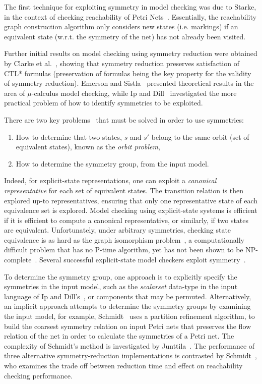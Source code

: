 The first technique for exploiting symmetry in model checking was due to
Starke, in the context of checking reachability of Petri
Nets~\cite{Starke1991}.  Essentially, the reachability graph construction
algorithm only considers new states (i.e.  markings) if an equivalent state
(w.r.t. the symmetry of the net) has not already been visited.

Further initial results on model checking using symmetry reduction were
obtained by {Clarke et al.}~\cite{Clarke1993a}, showing that symmetry reduction
preserves satisfaction of CTL* formulas (preservation of formulas being the key
property for the validity of symmetry reduction).  {Emerson and
Sistla}~\cite{Emerson1993} presented theoretical results in the area of
$\mu$-calculus model checking, while {Ip and Dill}~\cite{Ip1996} investigated
the more practical problem of how to identify symmetries to be
exploited.


There are two key problems~\cite{Clarke1998} that must be solved in order to
use symmetries:
\begin{enumerate}
    \item How to determine that two states, $s$ and $s'$ belong to the same
        orbit (set of equivalent states), known as the \emph{orbit problem},
    \item How to determine the symmetry group, from the input model.
\end{enumerate}

Indeed, for explicit-state representations, one can exploit a \emph{canonical
representative} for each set of equivalent states. The transition relation is
then explored up-to representatives, ensuring that only one representative
state of each equivalence set is explored. Model checking using explicit-state
systems is efficient if it is efficient to compute a canonical representative,
or similarly, if two states are equivalent. Unfortunately, under arbitrary
symmetries, checking state equivalence is as hard as the graph isomorphism
problem~\cite{Clarke1998}, a computationally difficult problem that has no
P-time algorithm, yet has not been shown to be NP-complete~\cite{Read1977}.
Several successful explicit-state model checkers exploit
symmetry~\cite{Sistla2000,Leuschel2003,Holzmann1997}.

To determine the symmetry group, one approach is to explicitly specify the
symmetries in the input model, such as the \emph{scalarset} data-type in the
input language of {Ip and Dill}'s~\cite{Ip1996}, or components that may be
permuted. Alternatively, an implicit approach attempts to determine the
symmetry groups by examining the input model, for example,
Schmidt~\cite{Schmidt2000} uses a partition refinement algorithm, to build the
coarsest symmetry relation on input Petri nets that preserves the flow relation
of the net in order to calculate the symmetries of a Petri net. The complexity
of Schmidt's method is investigated by Junttila~\cite{Junttila2001}.
The performance of three alternative symmetry-reduction implementations is
contrasted by Schmidt~\cite{Schmidt2000c}, who examines the trade off between
reduction time and effect on reachability checking performance.

